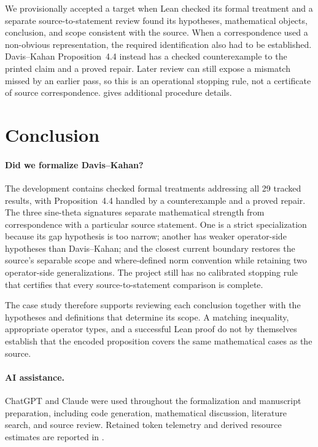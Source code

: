 \documentclass{article}
\begin{document}
We provisionally accepted a target when Lean checked its formal treatment and a
separate source-to-statement review found its hypotheses, mathematical objects,
conclusion, and scope consistent with the source.  When a correspondence used a
non-obvious representation, the required identification also had to be
established.  Davis--Kahan Proposition~4.4 instead has a checked counterexample
to the printed claim and a proved repair.  Later review can still expose a
mismatch missed by an earlier pass, so this is an operational stopping rule, not
a certificate of source correspondence.   gives additional
procedure details.

\section{Conclusion}

\paragraph{Did we formalize Davis--Kahan?}
The development contains checked formal treatments addressing all 29 tracked
results, with Proposition~4.4 handled by a counterexample
and a proved repair.  The three sine-theta signatures separate mathematical
strength from correspondence with a particular source statement.  One is a
strict specialization because its gap hypothesis is too narrow; another has
weaker operator-side hypotheses than Davis--Kahan; and the closest current
boundary restores the source's separable scope and where-defined norm convention
while retaining two operator-side generalizations.  The project still has no
calibrated stopping rule that certifies that every source-to-statement comparison
is complete.

The case study therefore supports reviewing each conclusion together with the
hypotheses and definitions that determine its scope.  A matching inequality,
appropriate operator types, and a successful Lean proof do not by themselves
establish that the encoded proposition covers the same mathematical cases as
the source.

\paragraph{AI assistance.}
ChatGPT and Claude were used throughout the formalization and manuscript
preparation, including code generation, mathematical discussion, literature
search, and source review. Retained token telemetry and derived resource estimates are
reported in .
\end{document}
